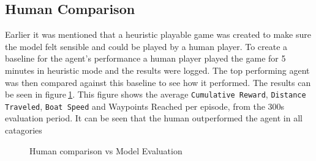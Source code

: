 \subsection*{Human Comparison}\label{hcomp}
Earlier it was mentioned that a heuristic playable game was created to make sure the model felt sensible and could be played by a human player. To create a baseline for the agent's performance a human player played the game for 5 minutes in heuristic mode and the results were logged. The top performing agent was then compared against this baseline to see how it performed. The results can be seen in figure$~$\ref{human_comparison}. This figure shows the average \texttt{Cumulative Reward}, \texttt{Distance Traveled}, \texttt{Boat Speed} and {Waypoints Reached} per episode, from the 300s evaluation period. It can be seen that the human outperformed the agent in all catagories

\begin{figure}
    \centering
    \caption{Human comparison vs Model Evaluation}\label{human_comparison}
\end{figure}

